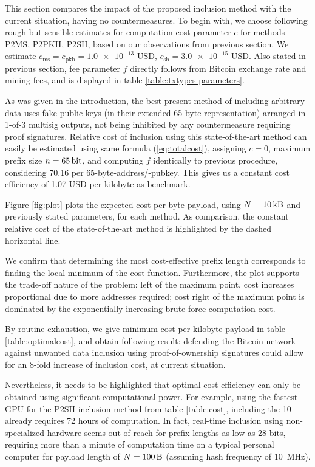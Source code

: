 \documentclass[a4paper,11pt,titlepage]{scrbook}
\begin{document}
This section compares the impact of the proposed inclusion method with the current situation, having no countermeasures.
To begin with, we choose following rough but sensible estimates for computation cost parameter $c$ for methods P2MS, P2PKH, P2SH, based on our observations from previous section.
We estimate $c_\text{ms}=c_\text{pkh}=\num{1.0e-13}$ USD, $c_\text{sh} = \num{3.0e-15}$ USD.
Also stated in previous section, fee parameter $f$ directly follows from Bitcoin exchange rate and mining fees, and is displayed in table \ref{table:txtypes-parameters}.

As was given in the introduction, the best present method of including arbitrary data uses fake public keys (in their extended 65 byte representation) arranged in 1-of-3 multisig outputs, not being inhibited by any countermeasure requiring proof signatures.
Relative cost of inclusion using this state-of-the-art method can easily be estimated using same formula (\ref{eq:totalcost}), assigning $c=0$, maximum prefix size $n=\SI{65}{\bit}$, and computing $f$ identically to previous procedure, considering \SI{70.16}{\byte} per 65-byte-address/-pubkey.
This gives us a constant cost efficiency of \num{1.07} USD per kilobyte as benchmark.

Figure \ref{fig:plot} plots the expected cost per byte payload, using $N=\SI{10}{\kilo\byte}$ and previously stated parameters, for each method.
As comparison, the constant relative cost of the state-of-the-art method is highlighted by the dashed horizontal line. 

We confirm that determining the most cost-effective prefix length corresponds to finding the local minimum of the cost function.
Furthermore, the plot supports the trade-off nature of the problem: left of the maximum point, cost increases proportional due to more addresses required; cost right of the maximum point is dominated by the exponentially increasing brute force computation cost.

By routine exhaustion, we give minimum cost per kilobyte payload in table \ref{table:optimalcost},
and obtain following result: 
defending the Bitcoin network against unwanted data inclusion using proof-of-ownership signatures could allow for an 8-fold increase of inclusion cost, at current situation.

Nevertheless, it needs to be highlighted that optimal cost efficiency can only be obtained using significant computational power.
For example, using the fastest GPU for the P2SH inclusion method from table \ref{table:cost}, including the \SI{10}{\kilo\byte} already requires 72 hours of computation.
In fact, real-time inclusion using non-specialized hardware seems out of reach for prefix lengths as low as 28 bits, requiring more than a minute of computation time on a typical personal computer for payload length of $N=\SI{100}{\byte}$ (assuming hash frequency of \SI{10}{\mega\hertz}).
\end{document}
